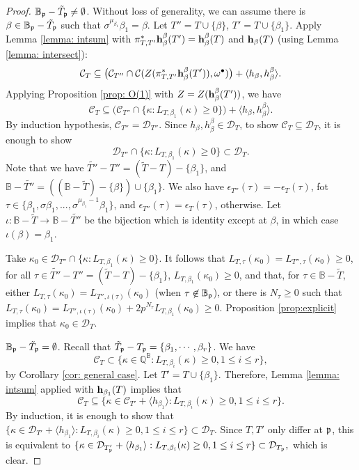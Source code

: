 \documentclass[11pt,pdflatex]{amsart}
\theoremstyle{plain}
\theoremstyle{definition}
\newcommand{\QQ}{\mathbf{Q}}
\theoremstyle{plain}
\theoremstyle{definition}
\theoremstyle{remark}
\numberwithin{equation}{section}
\numberwithin{figure}{section} \numberwithin{table}{subsection}
\newcommand{\gerp}{{\frak{p}}}
\newcommand{\calC}{{\mathcal{C}}}
\newcommand{\calD}{{\mathcal{D}}}
\def\BB{\mathbb{B}}
\def\QQ{\mathbb{Q}}
\begin{document}
\begin{proof}
 $\BB_\gerp-\tilde{T}_\gerp \neq \emptyset$. Without loss of generality, we can assume there is $\beta \in \BB_\gerp-\tilde{T}_\gerp$ such that $\sigma^{\mu_{\beta_1}}\beta_1=\beta$. Let $T''=T\cup\{\beta\}$, $T'=T\cup\{\beta_1\}$. Apply Lemma \ref{lemma: intsum} with $\pi_{T,T'}^*{\bf h}_\beta^\beta(T')={\bf h}_\beta^\beta(T)$ and ${\bf h}_{\beta}(T)$ (using Lemma \ref{lemma: intersect}):
$$\calC_T \subseteq \big(\calC_{T''} \cap \calC(Z(\pi_{T,T'}^*{\bf h}_\beta^\beta(T')),\omega^\bullet) \big)+\langle h_\beta, h_{\beta}^{\beta} \rangle.$$  Applying Proposition \ref{prop: O(1)} with $Z=Z({\bf h}_\beta^\beta(T'))$, we have 
$$\calC_T\subseteq \big(\calC_{T''} \cap \{\kappa: L_{T,\beta_1}(\kappa)\geq 0\}\big)+\langle h_{\beta}, h_{\beta}^{\beta} \rangle.$$  
 By induction hypothesis, $\calC_{T''}=\calD_{T''}$. Since $h_\beta,h_\beta^\beta \in \calD_T$,  to show $\calC_T \subseteq \calD_T$, it is enough to show $$\calD_{T''} \cap \{\kappa: L_{T,\beta_1}(\kappa)\geq 0\} \subset \calD_{T}.$$
Note that we have $\tilde{T''}-T''=(\tilde{T}-T)-\{\beta_1\}$, and $\BB-\tilde{T''}=((\BB-\tilde{T})-\{\beta\})\cup\{\beta_1\}$. We also have $\epsilon_{T''}(\tau)=-\epsilon_T(\tau)$, fot $\tau \in \{\beta_1,\sigma\beta_1,...,\sigma^{\mu_{\beta_1}-1}\beta_1\}$, and  $\epsilon_{T''}(\tau)=\epsilon_T(\tau)$, otherwise. Let $\iota: \BB-\tilde{T} \rightarrow \BB-\tilde{T''}$ be the bijection which is identity except at $\beta$, in which case $\iota(\beta)=\beta_1$. 

Take $\kappa_0 \in \calD_{T''} \cap \{\kappa: L_{T,\beta_1}(\kappa)\geq 0\}$. It follows that  $L_{T,\tau}(\kappa_0)=L_{T'',\tau}(\kappa_0)\geq 0$, for all $\tau \in \tilde{T''}-T''=(\tilde{T}-T)-\{\beta_1\}$, $L_{T,\beta_1}(\kappa_0)\geq 0$, and that, for $\tau \in \BB-\tilde{T}$,  either $L_{T,\tau}(\kappa_0)=L_{T'',\iota(\tau)}(\kappa_0)$ (when $\tau \not \in \BB_\gerp$), or there is $N_\tau\geq 0$ such that $L_{T,\tau}(\kappa_0)=L_{T'',\iota(\tau)}(\kappa_0)+2p^{N_\tau} L_{T,\beta_1}(\kappa_0)\geq 0$.  Proposition \ref{prop:explicit} implies that $\kappa_0 \in \calD_T$.

 \vspace{3 mm}
 
  $\BB_\gerp-\tilde{T}_\gerp =\emptyset$. Recall that $\tilde{T}_\gerp-T_\gerp=\{\beta_1,\cdots,\beta_r\}$. We have $$\calC_T \subset \{\kappa \in \QQ^\BB: L_{T,\beta_i}(\kappa) \geq 0,  1 \leq i \leq r  \},$$  by Corollary \ref{cor: general case}. Let $T'=T\cup\{\beta_1\}$.
 Therefore, Lemma \ref{lemma: intsum} applied with ${\bf h}_{\beta_1}(T)$   implies that
 $$\calC_T \subseteq \{\kappa \in \calC_{T'} + \langle h_{\beta_1} \rangle:  L_{T,\beta_i}(\kappa)\geq 0, 1 \leq i \leq r\}. $$
 By induction, it is enough to show that $\{\kappa \in \calD_{T'} + \langle h_{\beta_1} \rangle:  L_{T,\beta_i}(\kappa)\geq 0, 1 \leq i \leq r\} \subset \calD_T.$ Since $T,T'$ only differ at $\gerp$, this is equivalent to  $\{\kappa \in \calD_{T'_\gerp} + \langle h_{\beta_1} \rangle:  L_{T,\beta_i}(\kappa)\geq 0, 1 \leq i \leq r\} \subset \calD_{T_\gerp},$ which is clear.
  



  
\end{proof}
\end{document}
